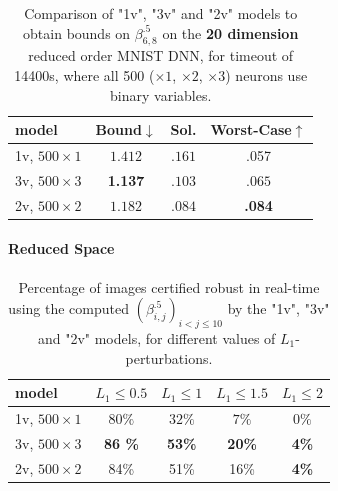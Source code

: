\begin{table}[b!]
	\centering
	\begin{tabular}{||l||c|c|c||}\hline\hline
		model &        Bound$\downarrow$ &  Sol. &      Worst-Case$\uparrow$ \\\hline \hline
	 

1v, $500 \times 1$ & $1.412$ & $.161$ & .057 \\\hline 
3v, $500 \times 3$ & {\bf 1.137} & $.103$ & $.065$\\\hline 
2v, $500 \times 2$ &  $1.182$ & $.084$& {\bf .084}  \\\hline\hline
	 
	\end{tabular}
	\caption{Comparison of "1v", "3v" and "2v" models 
	to obtain bounds on $\beta^{.5}_{6,8}$ on the {\bf 20 dimension} reduced order MNIST DNN, for timeout of 14400s, where 
	all %
	500 ($\times 1$, $\times 2$, $\times 3$) neurons use binary variables.}
	\label{table.reduced}
\end{table}


\paragraph{Reduced Space}



\begin{table}[b!]
	\begin{tabular}{||l||c|c|c|c||}\hline\hline
		model &    $L_1\leq 0.5$ & $L_1\leq 1$ & $L_1\leq 1.5$ &  $L_1\leq 2$ \\\hline \hline
		1v, $500\times1$ & $80 \%$ & $32\%$ & $7\%$ & $0\%$ \\\hline
		3v, $500 \times 3$ & {\bf 86 \%} & {\bf 53\%} & {\bf 20\%} & {\bf 4\%} \\\hline
		2v, $500 \times 2$ & 84\% & 51\% & 16\% & {\bf 4\%} \\\hline \hline
	\end{tabular}
	\caption{Percentage of images certified robust in real-time 
	using the computed $(\beta^{.5}_{i,j})_{i < j \leq 10}$ 
	by the "1v", "3v" and "2v" models, for different values of $L_1$-perturbations.}
    \label{table.cert}
\end{table}


